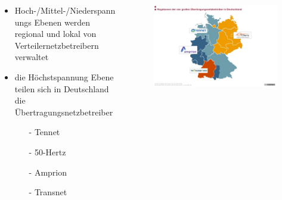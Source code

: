 \documentclass[aspectratio=1610, professionalfonts, 9pt]{beamer}
\begin{document}
\begin{frame}
  \begin{columns}
    \begin{column}{0.5\textwidth}
  \begin{itemize}
    \item Hoch-/Mittel-/Niederspannungs Ebenen
     werden regional und lokal von Verteilernetzbetreibern verwaltet
    \item die Höchstspannung Ebene teilen sich in
    Deutschland die Übertragungsnetzbetreiber
    \begin{itemize}
      \item[-] Tennet
      \item[-] 50-Hertz
      \item[-] Amprion
      \item[-] Transnet
  \end{itemize}
\end{itemize}
\end{column}
\begin{column}{0.5\textwidth}
\begin{figure}
    \includegraphics[width=1\textwidth]{images/UNB.jpg}
\end{figure}
\end{column}
\end{columns}
\end{frame}
\end{document}
